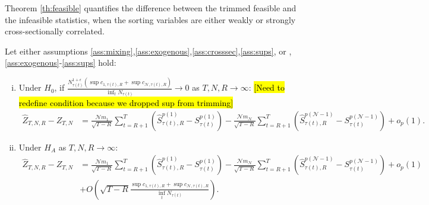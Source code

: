 \noindent


Theorem \ref{th:feasible} quantifies the difference between the trimmed feasible and the infeasible statistics, when the sorting variables are either weakly or strongly cross-sectionally correlated.

\begin{theorem}
\label{th:feasible} Let either assumptions \ref{ass:mixing},\ref{ass:exogenous},\ref{ass:crosssec},\ref{ass:sups}, or , \ref{ass:exogenous}-\ref{ass:sups} hold:

\begin{enumerate}[(i)]
\item Under $H_{0}$, if $\frac{N_{\tau(t)}^{1+\epsilon} \left( \sup c_{1,\tau(t),R} + \sup c_{\mathcal{N},\tau(t),R} \right)}{\inf_{t}N_{\tau(t)}} \rightarrow 0$ as $T,N,R\rightarrow \infty$: \hl{[Need to redefine condition because we dropped sup from trimming]}
\begin{align*}
	\widehat{Z}_{T,N,R}-Z_{T,N} &= \frac{\mathcal{N} m_{1}}{\sqrt{T-R}}\sum_{t=R+1}^{T} \left( \widehat{S}_{\tau(t),R}^{p(1)}-S_{\tau(t) }^{p(1)}\right) -\frac{\mathcal{N} m_{\mathcal{N}}}{\sqrt{T-R}}\sum_{t=R+1}^{T} \left(\widehat{S}_{\tau(t),R}^{p(\mathcal{N}-1)}-S_{\tau(t) }^{p(\mathcal{N}-1)}\right) +o_{p}(1).
\end{align*}

\item Under $H_{A}$ as $T,N,R\rightarrow \infty$:
\begin{align*}
	\widehat{Z}_{T,N,R}-Z_{T,N} &= \frac{\mathcal{N} m_{1}}{\sqrt{T-R}}\sum_{t=R+1}^{T} \left( \widehat{S}_{\tau(t),R}^{p(1)}-S_{\tau(t) }^{p(1)}\right) -\frac{\mathcal{N} m_{\mathcal{N}}}{\sqrt{T-R}}\sum_{t=R+1}^{T} \left(\widehat{S}_{\tau(t),R}^{p(\mathcal{N}-1)}-S_{\tau(t) }^{p(\mathcal{N}-1)}\right) +o_{p}(1) \\
	&+ O \left( \sqrt{T-R} \frac{ \sup c_{1,\tau(t),R} + \sup c_{\mathcal{N},\tau(t),R}}{\inf_{t}N_{\tau(t)}} \right).
\end{align*}
\end{enumerate}
\end{theorem}

